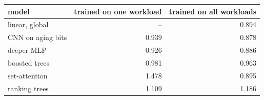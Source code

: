 \begin{tabular}{lrr}
\toprule
model & trained on one workload & trained on all workloads \\
\midrule
linear, global & -- & 0.894 \\
CNN on aging bits & 0.939 & 0.878 \\
deeper MLP & 0.926 & 0.886 \\
boosted trees & 0.981 & 0.963 \\
set-attention & 1.478 & 0.895 \\
ranking trees & 1.109 & 1.186 \\
\bottomrule
\end{tabular}
